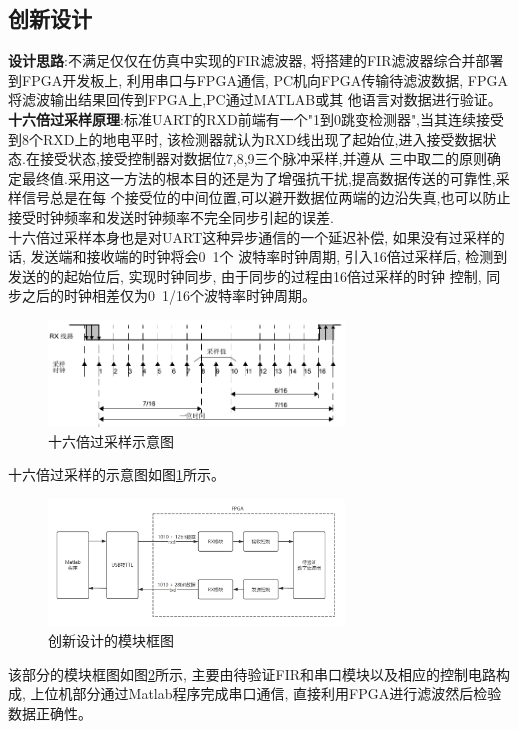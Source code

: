 \documentclass{article}
\begin{document}
\subsection*{创新设计}
\textbf{设计思路}:不满足仅仅在仿真中实现的FIR滤波器, 将搭建的FIR滤波器综合并部署到FPGA开发板上, 
利用串口与FPGA通信, PC机向FPGA传输待滤波数据, FPGA将滤波输出结果回传到FPGA上,PC通过MATLAB或其
他语言对数据进行验证。\\

\textbf{十六倍过采样原理}:标准UART的RXD前端有一个"1到0跳变检测器",当其连续接受到8个RXD上的地电平时,
该检测器就认为RXD线出现了起始位,进入接受数据状态.在接受状态,接受控制器对数据位7,8,9三个脉冲采样,并遵从
三中取二的原则确定最终值.采用这一方法的根本目的还是为了增强抗干扰,提高数据传送的可靠性,采样信号总是在每
个接受位的中间位置,可以避开数据位两端的边沿失真,也可以防止接受时钟频率和发送时钟频率不完全同步引起的误差.\\

十六倍过采样本身也是对UART这种异步通信的一个延迟补偿, 如果没有过采样的话, 发送端和接收端的时钟将会0~1个
波特率时钟周期, 引入16倍过采样后, 检测到发送的的起始位后, 实现时钟同步, 由于同步的过程由16倍过采样的时钟
控制, 同步之后的时钟相差仅为0~1/16个波特率时钟周期。\\
\begin{figure}[htbp]
    \centering
    \includegraphics[width=0.7\textwidth]{image/2024-06-27-22-04-57.png}
    \caption{十六倍过采样示意图}
    \label{image_design_innovation_1}
\end{figure}
十六倍过采样的示意图如图\ref{image_design_innovation_1}所示。

\begin{figure}[H]
    \centering
    \includegraphics[width=0.7\textwidth]{image/2024-06-29-22-29-18.png}
    \caption{创新设计的模块框图}
    \label{image_design_innovation_2}
\end{figure}
该部分的模块框图如图\ref{image_design_innovation_2}所示, 主要由待验证FIR和串口模块以及相应的控制电路构成, 
上位机部分通过Matlab程序完成串口通信, 直接利用FPGA进行滤波然后检验数据正确性。
\end{document}
